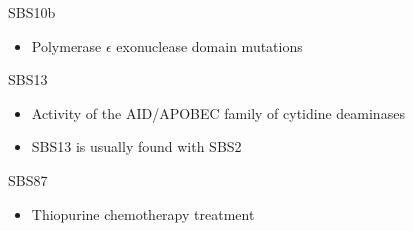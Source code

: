 \documentclass{beamer}
\begin{document}
\begin{frame}[allowframebreaks]
        \begin{block}{SBS10b}
            \begin{itemize}
                \item Polymerase $\epsilon$ exonuclease domain mutations \cite{signature1}
            \end{itemize}
        \end{block}

        \begin{block}{SBS13}
            \begin{itemize}
                \item Activity of the AID/APOBEC family of cytidine deaminases \cite{signature4}
                \item SBS13 is usually found with SBS2
            \end{itemize}
        \end{block}

        \begin{block}{SBS87}
            \begin{itemize}
                \item Thiopurine chemotherapy treatment \cite{signature5}
            \end{itemize}
        \end{block}
    \end{frame}
\end{document}
